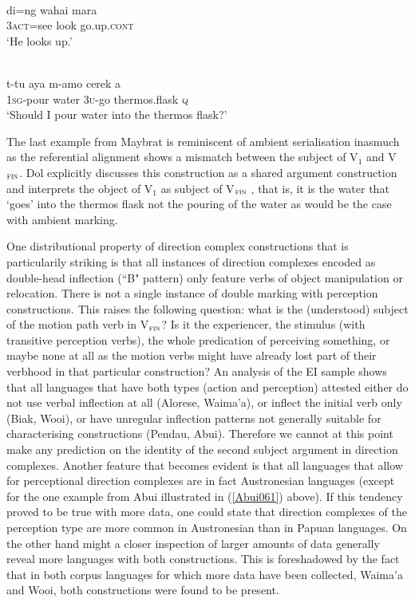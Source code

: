 \ea \label{Abui061}
\\
\gll di=ng wahai mara \\
\textsc{3}\textsc{act}=see look go.up.\textsc{cont} \\
\glft ‘He looks up.’\\ 
\z
\xe

\ea \label{Maybrat102}
\\
\gll t-tu aya m-amo cerek a \\
\textsc{1}\textsc{sg}-pour water \textsc{3}\textsc{u}-go thermos.flask \textsc{q} \\
\glft `Should I pour water into the thermos flask?'\\ 
\z

The last example from Maybrat is reminiscent of ambient serialisation inasmuch as the referential alignment shows a mismatch between the subject of V$_{1}$ and V$_{\textsc{fin}}$. Dol explicitly discusses this construction as a shared argument construction and interprets the object of V$_{1}$ as subject of V$_{\textsc{fin}}$ \citep[217]{dol2007grammar}, that is, it is the water that `goes' into the thermos flask not the pouring of the water as would be the case with ambient marking. 

One distributional property of direction complex constructions that is particularily striking is that all instances of direction complexes encoded as double-head inflection (``B" pattern) only feature verbs of object manipulation or relocation. There is not a single instance of double marking with perception constructions. This raises the following question: what is the (understood) subject of the motion path verb in V$_{\textsc{fin}}$? Is it the experiencer, the stimulus (with transitive perception verbs), the whole predication of perceiving something, or maybe none at all as the motion verbs might have already lost part of their verbhood in that particular construction? An analysis of the EI sample shows that all languages that have both types (action and perception) attested either do not use verbal inflection at all (Alorese, Waima'a), or inflect the initial verb only (Biak, Wooi), or have unregular inflection patterns not generally suitable for characterising constructions (Pendau, Abui). Therefore we cannot at this point make any prediction on the identity of the second subject argument in direction complexes. Another feature that becomes evident is that all languages that allow for perceptional direction complexes are in fact Austronesian languages (except for the one example from Abui illustrated in (\ref{Abui061}) above). If this tendency proved to be true with more data, one could state that direction complexes of the perception type are more common in Austronesian than in Papuan languages. On the other hand might a closer inspection of larger amounts of data generally reveal more languages with both constructions. This is foreshadowed by the fact that in both corpus languages for which more data have been collected, Waima'a and Wooi, both constructions were found to be present.

